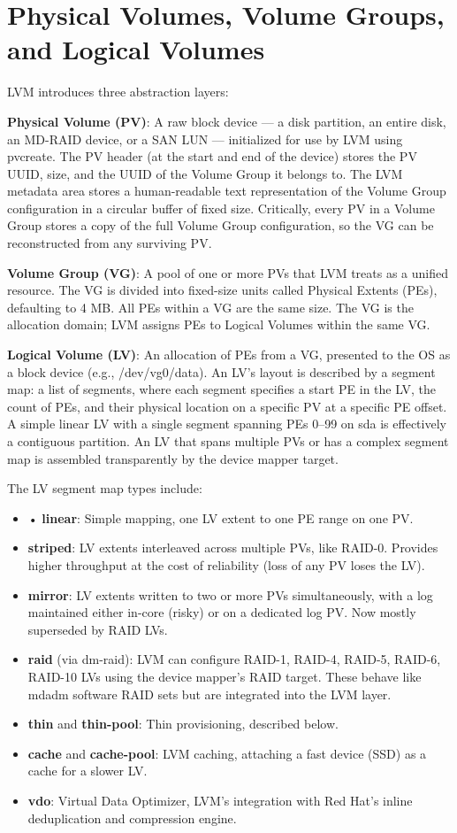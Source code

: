 \section{Physical Volumes, Volume Groups, and Logical Volumes}
LVM introduces three abstraction layers:

\textbf{Physical Volume (PV)}: A raw block device --- a disk partition, an entire disk, an MD-RAID device, or a SAN LUN --- initialized for use by LVM using pvcreate. The PV header (at the start and end of the device) stores the PV UUID, size, and the UUID of the Volume Group it belongs to. The LVM metadata area stores a human-readable text representation of the Volume Group configuration in a circular buffer of fixed size. Critically, every PV in a Volume Group stores a copy of the full Volume Group configuration, so the VG can be reconstructed from any surviving PV.

\textbf{Volume Group (VG)}: A pool of one or more PVs that LVM treats as a unified resource. The VG is divided into fixed-size units called Physical Extents (PEs), defaulting to 4 MB. All PEs within a VG are the same size. The VG is the allocation domain; LVM assigns PEs to Logical Volumes within the same VG.

\textbf{Logical Volume (LV)}: An allocation of PEs from a VG, presented to the OS as a block device (e.g., /dev/vg0/data). An LV's layout is described by a segment map: a list of segments, where each segment specifies a start PE in the LV, the count of PEs, and their physical location on a specific PV at a specific PE offset. A simple linear LV with a single segment spanning PEs 0--99 on sda is effectively a contiguous partition. An LV that spans multiple PVs or has a complex segment map is assembled transparently by the device mapper target.

The LV segment map types include:

\begin{itemize}
  \item • \textbf{linear}: Simple mapping, one LV extent to one PE range on one PV.
  \item \textbf{striped}: LV extents interleaved across multiple PVs, like RAID-0. Provides higher throughput at the cost of reliability (loss of any PV loses the LV).
  \item \textbf{mirror}: LV extents written to two or more PVs simultaneously, with a log maintained either in-core (risky) or on a dedicated log PV. Now mostly superseded by RAID LVs.
  \item \textbf{raid} (via dm-raid): LVM can configure RAID-1, RAID-4, RAID-5, RAID-6, RAID-10 LVs using the device mapper's RAID target. These behave like mdadm software RAID sets but are integrated into the LVM layer.
  \item \textbf{thin} and \textbf{thin-pool}: Thin provisioning, described below.
  \item \textbf{cache} and \textbf{cache-pool}: LVM caching, attaching a fast device (SSD) as a cache for a slower LV.
  \item \textbf{vdo}: Virtual Data Optimizer, LVM's integration with Red Hat's inline deduplication and compression engine.
\end{itemize}

